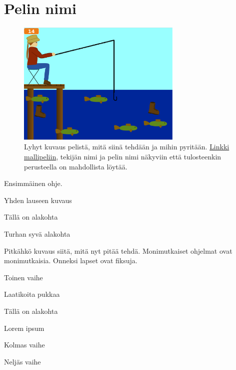 \documentclass[12pt,twoside]{article}
\begin{document}
\selectfont
\section*{Pelin nimi}

\begin{figure}
  \centering
  \captionsetup{labelformat=empty}
  \caption{Lyhyt kuvaus pelistä, mitä siinä tehdään ja mihin pyritään. \href{https://google.fi}{Linkki mallipeliin}, tekijän nimi ja pelin nimi näkyviin että tulosteenkin perusteella on mahdollista löytää.}
  \includegraphics[width=0.7\textwidth]{kuvat/esimerkki.png}
\end{figure}

\begin{vaihetaso1}
	\item Ensimmäinen ohje.
	
	\begin{vaihetaso2}
		\item Yhden lauseen kuvaus
		\item Tällä on alakohta
		
		\begin{vaihetaso3}
			\item Turhan syvä alakohta
		\end{vaihetaso3}
		\item Pitkähkö kuvaus siitä, mitä nyt pitää tehdä. Monimutkaiset ohjelmat ovat monimutkaisia. Onneksi lapset ovat fiksuja.
	\end{vaihetaso2}
	\item Toinen vaihe
	
	\begin{vaihetaso2}
		\item Laatikoita pukkaa
		\item Tällä on alakohta
		\item Lorem ipsum
	\end{vaihetaso2}
	\item Kolmas vaihe
	\item Neljäs vaihe
\end{vaihetaso1}
\end{document}
